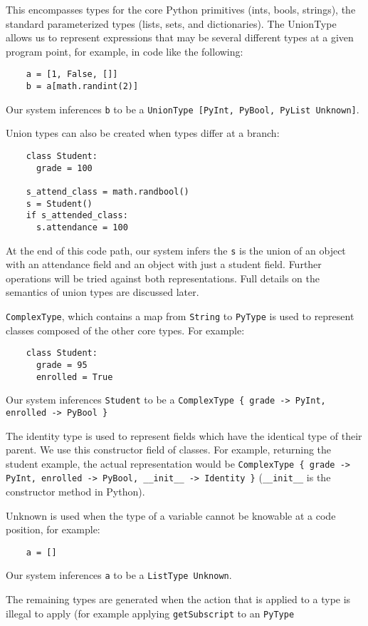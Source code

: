 \documentclass{article}[12pt]
\begin{document}
This encompasses types for the core Python primitives (ints, bools, strings), the standard parameterized types (lists, sets, and dictionaries). The UnionType allows us to represent expressions that may be several different types at a given program point, for example, in code like the following:

\begin{verbatim}
    a = [1, False, []]
    b = a[math.randint(2)]
\end{verbatim}

Our system inferences \verb=b= to be a \verb=UnionType [PyInt, PyBool, PyList Unknown]=.

Union types can also be created when types differ at a branch:
\begin{verbatim}
    class Student:
      grade = 100

    s_attend_class = math.randbool()
    s = Student()
    if s_attended_class:
      s.attendance = 100
\end{verbatim}
At the end of this code path, our system infers the \texttt{s} is the union of an object with an attendance field and an
object with just a student field. Further operations will be tried against both representations. Full details on the
semantics of union types are discussed later.

\verb=ComplexType=, which contains a map from \verb=String= to \verb=PyType= is used to represent
classes composed of the other core types. For example:
\begin{verbatim}
    class Student:
      grade = 95 
      enrolled = True
\end{verbatim}

Our system inferences \verb=Student= to be a 
\verb=ComplexType { grade -> PyInt, enrolled -> PyBool }=

The identity type is used to represent fields which have the identical type of their parent. We use
this constructor field of classes. For example, returning the student example, the actual
representation would be
\verb=ComplexType { grade -> PyInt, enrolled -> PyBool, __init__ -> Identity }=
(\verb=__init__= is the constructor method in Python).

Unknown is used when the type of a variable cannot be knowable at a code position, for example:
\begin{verbatim}
    a = []
\end{verbatim}
Our system inferences \verb=a= to be a \verb=ListType Unknown=.

The remaining types are generated when the action that is applied to a type is illegal to apply (for
example applying \verb=getSubscript= to an \verb=PyType=
\end{document}
